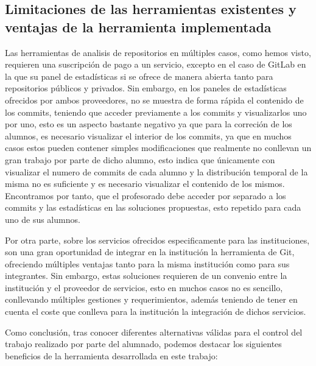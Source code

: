 \subsection{Limitaciones de las herramientas existentes y ventajas de la
  herramienta implementada}

Las herramientas de analisis de repositorios en múltiples casos, como hemos
visto, requieren una suscripción de pago a un servicio, excepto en el caso
de GitLab en la que su panel de estadísticas si se ofrece de manera abierta
tanto para repositorios públicos y privados. Sin embargo, en los paneles de
estadísticas ofrecidos por ambos proveedores, no se muestra de forma rápida
el contenido de los commits, teniendo que acceder previamente a los commits
y visualizarlos uno por uno, esto es un aspecto bastante negativo ya que
para la correción de los alumnos, es necesario visualizar el interior de
los commits, ya que en muchos casos estos pueden contener simples
modificaciones que realmente no conllevan un gran trabajo por parte de
dicho alumno, esto indica que únicamente con visualizar el numero de
commits de cada alumno y la distribución temporal de la misma no es
suficiente y es necesario visualizar el contenido de los mismos.
Encontramos por tanto, que el profesorado debe acceder por separado a los
commits y las estadísticas en las soluciones propuestas, esto repetido para
cada uno de sus alumnos.

Por otra parte, sobre los servicios ofrecidos especificamente para las
instituciones, son una gran oportunidad de integrar en la institución la
herramienta de Git, ofreciendo múltiples ventajas tanto para la misma
institución como para sus integrantes. Sin embargo, estas soluciones
requieren de un convenio entre la institución y el proveedor de servicios,
esto en muchos casos no es sencillo, conllevando múltiples gestiones y
requerimientos, además teniendo de tener en cuenta el coste que conlleva
para la institución la integración de dichos servicios.

Como conclusión, tras conocer diferentes alternativas válidas para el
control del trabajo realizado por parte del alumnado, podemos destacar los
siguientes beneficios de la herramienta desarrollada en este trabajo:


